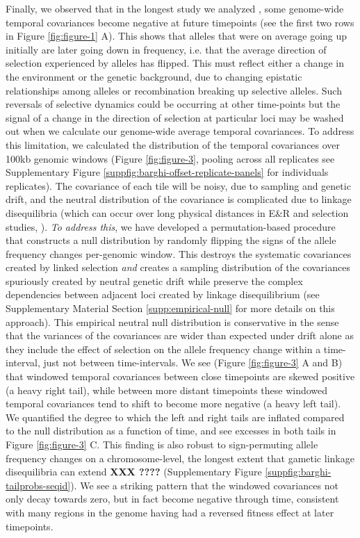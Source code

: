 \documentclass[11pt]{article}
\newcommand{\vb}[1]{{\it \color{blue} #1}}
\begin{document}
Finally, we observed that in the longest study  we analyzed
\parencite{Barghi2019-qy}, some genome-wide temporal covariances become
negative at future timepoints (see the first two rows in Figure
\ref{fig:figure-1} A). This shows that alleles that were on average going up
initially are later going down in frequency, i.e. that the average direction of
selection experienced by alleles has flipped. This must reflect either a change
in the environment or the genetic background, due to changing epistatic
relationships among alleles or  recombination breaking up selective alleles.
Such reversals of selective dynamics could be occurring at other time-points
but the signal of a change in the direction of selection at particular loci may
be washed out when we calculate our genome-wide average temporal covariances.
To address this limitation, we calculated the distribution of the temporal
covariances over 100kb genomic windows (Figure \ref{fig:figure-3}, pooling
across all replicates see Supplementary Figure
\ref{suppfig:barghi-offset-replicate-panels} for individuals replicates).  The
covariance of each tile will be noisy, due to sampling and genetic drift, and
the neutral distribution of the covariance is complicated due to linkage
disequilibria (which can occur over long physical distances in E\&R and
selection studies, \cite{Nuzhdin2013-gf,Baldwin-Brown2014-cl}). \vb{To address
this}, we have developed a permutation-based procedure that constructs a null
distribution by randomly flipping the signs of the   allele frequency changes
per-genomic window. This destroys the systematic covariances created by linked
selection \vb{and} creates a sampling distribution of the covariances
spuriously created by neutral genetic drift while preserve the complex
dependencies between adjacent loci created by linkage disequilibrium (see
Supplementary Material Section \ref{supp:empirical-null} for more details on
this approach).  This empirical neutral null distribution is conservative in
the sense that the variances of the covariances are wider than expected under
drift alone as they include the effect of selection on the allele frequency
change within a time-interval, just not between time-intervals. We see (Figure
\ref{fig:figure-3} A and B) that windowed temporal covariances between close
timepoints are skewed positive (a heavy right tail), while between more distant
timepoints these windowed temporal covariances tend to shift to become more
negative (a heavy left tail).  We quantified the degree to which the left and
right tails are inflated compared to the null distribution as a function of
time, and see excesses in both tails in Figure \ref{fig:figure-3} C. This
finding is also robust to sign-permuting allele frequency changes on a
chromosome-level, the longest extent that gametic linkage disequilibria can
extend {\bf XXX ????} (Supplementary Figure
\ref{suppfig:barghi-tailprobs-seqid}). We see a striking pattern that the
windowed covariances not only decay towards zero, but in fact become negative
through time, consistent with many regions in the genome having had a reversed
fitness effect at later timepoints.
\end{document}
